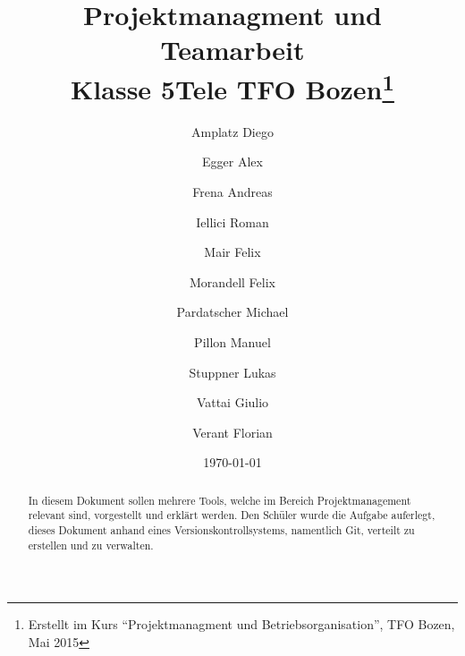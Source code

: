 \documentclass[a4paper]{article}
\title{Projektmanagment und Teamarbeit\\Klasse 5Tele TFO Bozen\thanks{Erstellt 
im Kurs ``Projektmanagment und Betriebsorganisation'', TFO Bozen, Mai 2015}}
\author{Amplatz Diego
\and	Egger Alex
\and	Frena Andreas
\and	Iellici Roman
\and	Mair Felix
\and	Morandell Felix
\and	Pardatscher Michael
\and	Pillon Manuel
\and	Stuppner Lukas
\and	Vattai Giulio
\and	Verant Florian}
\begin{document}
\date{\today}

\maketitle

\begin{abstract}
 In diesem Dokument sollen mehrere Tools, welche im Bereich Projektmanagement relevant sind, vorgestellt und erklärt werden. Den Schüler wurde die Aufgabe auferlegt, dieses Dokument anhand eines Versionskontrollsystems, namentlich Git, verteilt zu erstellen und zu verwalten. 
\end{abstract}

\newpage


\begin{sloppypar}
\tableofcontents













\end{sloppypar}
\end{document}
